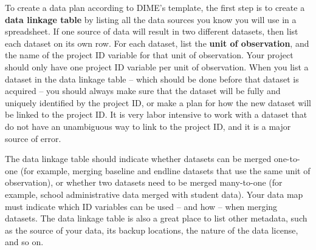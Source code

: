 To create a data plan according to DIME's template, 
the first step is to create a \textbf{data linkage table} by listing
all the data sources you know you will use in a spreadsheet.
If one source of data will result in two different datasets, 
then list each dataset on its own row.
For each dataset, list the \textbf{unit of observation},
and the name of the project ID variable for that unit of observation.
Your project should only have one project ID variable per unit of observation. 
When you list a dataset in the data linkage table --
which should be done before that dataset is acquired --
you should always make sure that the dataset will
be fully and uniquely identified by the project ID, 
or make a plan for how 
the new dataset will be linked to the project ID.
It is very labor intensive to work with a dataset that
do not have an unambiguous way to link to the project ID, 
and it is a major source of error.

The data linkage table should indicate whether 
datasets can be merged one-to-one (for example, 
merging baseline and endline datasets 
that use the same unit of observation),
or whether two datasets need to be merged many-to-one
(for example, school administrative data merged with student data).
Your data map must indicate which ID variables 
can be used -- and how -- when merging datasets.
The data linkage table is also a great place to list other metadata,
such as the source of your data, its backup locations, 
the nature of the data license, and so on.


